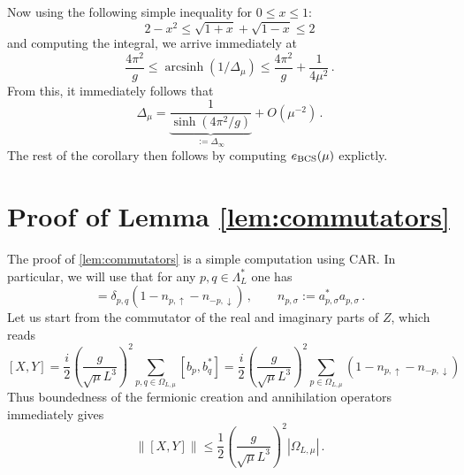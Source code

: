 \documentclass[11pt]{amsart}
\theoremstyle{definition}
\numberwithin{equation}{section}
\newcommand{\1}{\mathbf 1}
\begin{document}
Now using the following simple inequality for $0 \leq x \leq 1$:
\begin{equation*}
    2-x^2 \leq \sqrt{1+x} + \sqrt{1-x} \leq 2
\end{equation*}
and computing the integral, we arrive immediately at
\begin{equation*}
   \frac{4\pi^2}{g}  \leq \operatorname{arcsinh}(1/\Delta_{\mu}) \leq \frac{4\pi^2}{g} + \frac{1}{4\mu^2}\,.
\end{equation*}
From this, it immediately follows that
\begin{equation*}
    \Delta_{\mu} = \underbrace{\frac{1}{\sinh(4\pi^2/g)}}_{:= \Delta_{\infty}} + O(\mu^{-2})\,.
\end{equation*}
The rest of the corollary then follows by computing $e_{\rm BCS}(\mu)$ explictly.


\section{Proof of Lemma \ref{lem:commutators}}\label{app:commutators}
The proof of \ref{lem:commutators} is a simple computation using CAR. In particular, we will use that for any $p, q \in \Lambda_L^*$ one has
\begin{equation*}
    [b_p, b_q^*] = \delta_{p,q}\left( 1 - n_{p, \uparrow} - n_{-p, \downarrow} \right)\,, \qquad n_{p, \sigma} := a^*_{p, \sigma}a_{p, \sigma}\,.
\end{equation*}
Let us start from the commutator of the real and imaginary parts of $Z$, which reads
\[
 [X,Y]
 =\frac{i}{2}\left(\frac{g}{\sqrt{\mu}L^3} \right)^2\sum_{p, q \in \Omega_{L, \mu}}[b_p, b^*_q] = \frac{i}{2}\left(\frac{g}{\sqrt{\mu}L^3} \right)^2\sum_{p\in \Omega_{L, \mu}}(1 - n_{p, \uparrow} - n_{-p, \downarrow})
\]
Thus boundedness of the fermionic creation and annihilation operators immediately gives
\[
\| [X,Y] \| \leq \frac{1}{2}\left(\frac{g}{\sqrt{\mu}L^3} \right)^2|\Omega_{L, \mu}|\,.
\]
\end{document}
